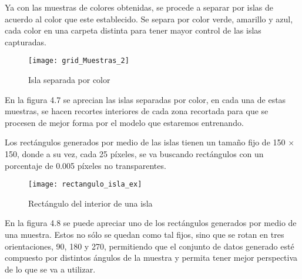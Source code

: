 Ya con las muestras de colores obtenidas, se procede a separar por islas de acuerdo al color que este establecido. Se separa por color verde, amarillo y azul, cada color en una carpeta distinta para tener mayor control de las islas capturadas.

\begin{figure}[H]
  \centering
  \begin{minipage}[b]{0.6\textwidth}
        \texttt{[image: grid\_Muestras\_2]}
    \caption{Isla separada por color}
  \end{minipage}
\end{figure}

En la figura 4.7 se aprecian las islas separadas por color, en cada una de estas muestras, se hacen recortes interiores de cada zona recortada para que se procesen de mejor forma por el modelo que estaremos entrenando. 

Los rectángulos generados por medio de las islas tienen un tamaño fijo de 150  $\times$ 150, donde a su vez, cada 25 píxeles, se va buscando rectángulos con un porcentaje de 0.005 píxeles no transparentes.


\begin{figure}[h]
  \centering
  \begin{minipage}[b]{0.7\textwidth}
        \texttt{[image: rectangulo\_isla\_ex]}
    \caption{Rectángulo del interior de una isla}
  \end{minipage}
\end{figure}


En la figura 4.8 se puede apreciar uno de los rectángulos generados por medio de una muestra. Estos no sólo se quedan como tal fijos, sino que se rotan en tres orientaciones, 90, 180 y 270, permitiendo que el conjunto de datos generado esté compuesto por distintos ángulos de la muestra y permita tener mejor perspectiva de lo que se va a utilizar.

\break

%
%
%
%
%

